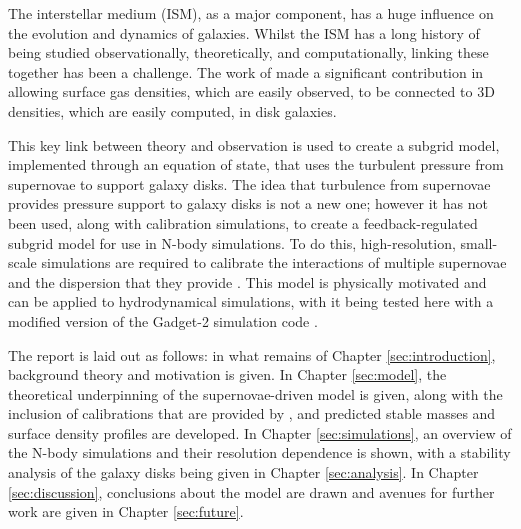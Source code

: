 The interstellar medium (ISM), as a major component, has a huge influence on the evolution and dynamics of galaxies.
Whilst the ISM has a long history of being studied observationally, theoretically, and computationally, linking these together has been a challenge.
The work of \citet{schaye_model-independent_2001} made a significant contribution in allowing surface gas densities, which are easily observed, to be connected to 3D densities, which are easily computed, in disk galaxies.

This key link between theory and observation is used to create a subgrid model, implemented through an equation of state, that uses the turbulent pressure from supernovae to support galaxy disks.
The idea that turbulence from supernovae provides pressure support to galaxy disks is not a new one; \citep{silk_feedback_1997, ostriker_maximally_2011, faucher-giguere_feedback-regulated_2013, martizzi_supernova_2016} however it has not been used, along with calibration simulations, to create a feedback-regulated subgrid model for use in N-body simulations.
To do this, high-resolution, small-scale simulations are required to calibrate the interactions of multiple supernovae and the dispersion that they provide \citep{martizzi_supernova_2015}.
This model is physically motivated and can be applied to hydrodynamical simulations, with it being tested here with a modified version of the Gadget-2 simulation code \citep{springel_cosmological_2003, springel_cosmological_2005}.

The report is laid out as follows: in what remains of Chapter \ref{sec:introduction}, background theory and motivation is given.
In Chapter \ref{sec:model}, the theoretical underpinning of the supernovae-driven model is given, along with the inclusion of calibrations that are provided by \citet{martizzi_supernova_2015}, and predicted stable masses and surface density profiles are developed.
In Chapter \ref{sec:simulations}, an overview of the N-body simulations and their resolution dependence is shown, with a stability analysis of the galaxy disks being given in Chapter \ref{sec:analysis}.
In Chapter \ref{sec:discussion}, conclusions about the model are drawn and avenues for further work are given in Chapter \ref{sec:future}.
